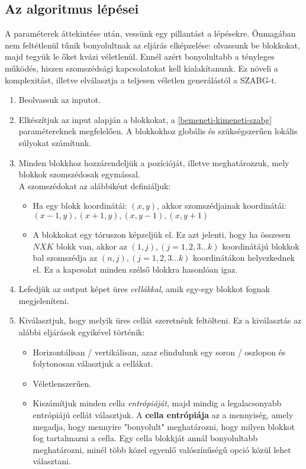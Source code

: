 \subsection{Az algoritmus lépései}
A paraméterek áttekintése után, vessünk egy pillantást a lépésekre. Önmagában nem feltétlenül tűnik bonyolultnak az eljárás elképzelése: olvassunk be blokkokat, majd tegyük le őket kvázi véletlenül. Ennél azért bonyolultabb a tényleges működés, hiszen szomszédsági kapcsolatokat kell kialakítanunk. Ez növeli a komplexitást, illetve elválasztja a teljesen véletlen generálástól a SZABG-t.
\begin{enumerate}
    \item Beolvassuk az inputot.
    \item Elkészítjuk az input alapján a blokkokat, a \ref{bemeneti-kimeneti-szabg} paramétereknek megfelelően. A blokkokhoz globális és szükségszerűen lokális súlyokat számítunk.
    \item Minden blokkhoz hozzárendeljük a pozícióját, illetve meghatározzuk, mely blokkok szomszédosak egymással.\\
    A szomszédokat az alábbiként definiáljuk:
    \begin{itemize}
        \item Ha egy blokk koordinátái: $(x,y)$, akkor szomszédjainak koordinátái: \\
        $(x-1,y), (x+1,y), (x,y-1),(x,y+1)$
        \item A blokkokat egy tóruszon képzeljük el. Ez azt jelenti, hogy ha összesen $NXK$ blokk van, akkor az $(1,j), (j = 1,2,3...k)$ koordinátájú blokkok bal szomszédja az $(n,j), (j = 1,2,3...k)$ koordinátákon helyezkednek el. Ez a kapcsolat minden szélső blokkra hasonlóan igaz.
    \end{itemize}
    \item Lefedjük az output képet üres \textit{cellákkal}, amik egy-egy blokkot fognak megjeleníteni.
    \item Kiválasztjuk, hogy melyik üres cellát szeretnénk feltölteni. Ez a kiválasztás az alábbi eljárások egyikével történik:
    \begin{itemize}
    \label{item:modszer}
        \item Horizontálisan / vertikálisan, azaz elindulunk egy soron / oszlopon és folytonosan választjuk a cellákat.
        \item Véletlenszerűen.
        \item Kiszámítjuk minden cella \textit{entrópiáját}, majd mindig a legalacsonyabb entrópiájú cellát választjuk. A \textbf{cella entrópiája} az a mennyiség, amely megadja, hogy mennyire "bonyolult" meghatározni, hogy milyen blokkot fog tartalmazni a cella. Egy cella blokkját annál bonyolultabb meghatározni, minél több közel egyenlő valószínűségű opció közül lehet választani.\\

\end{itemize}
\end{enumerate}
